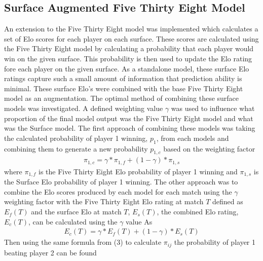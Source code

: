 \documentclass[12pt,a4paper]{article}
\begin{document}
\subsection{Surface Augmented Five Thirty Eight Model}
An extension to the Five Thirty Eight model was implemented which calculates a set of
Elo scores for each player on each surface. These scores are calculated using the
Five Thirty Eight model by calculating a probability that each player would win on the
given surface. This probability is then used to update the Elo rating fore each player
on the given surface. As a standalone model, these surface Elo ratings capture such a
small amount of information that prediction ability is minimal. These surface Elo's were
combined with the base Five Thirty Eight model as an augmentation.
The optimal method of combining these surface models was investigated. A defined weighting
value $\gamma$ was used to influence what proportion of the final model output was
the Five Thirty Eight model and what was the Surface model. The first approach of
combining these models was taking the calculated probability of player 1 winning, $p_1$,
from each models and combining them to generate a new probability $p_{1,c}$ based
on the weighting factor
\begin{gather}
  \pi_{1,c} = \gamma*\pi_{1,f} + (1-\gamma)*\pi_{1,s}
\end{gather}
where $\pi_{1,f}$ is the Five Thirty Eight Elo probability of player 1 winning and
$\pi_{1,s}$ is the Surface Elo probability of player 1 winning.
The other approach was to combine the Elo scores produced by each model for each match
using the $\gamma$ weighting factor with the Five Thirty Eight Elo rating at match $T$
defined as $E_{f}(T)$ and the surface Elo at match $T$, $E_{s}(T)$,
the combined Elo rating, $E_{c}(T)$, can be calculated using the $\gamma$ value As
\begin{gather}
  E_{c}(T) = \gamma*E_{f}(T) + (1-\gamma)*E_{s}(T)
\end{gather}
Then using the same formula from (3) to calculate $\pi_{ij}$ the probability of player
1 beating player 2 can be found
\clearpage
\end{document}

